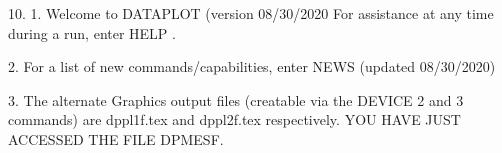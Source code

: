 10.
1. Welcome to DATAPLOT (version 08/30/2020  For assistance at
   any time during a run, enter HELP   .

2. For a list of new commands/capabilities,
   enter NEWS  (updated 08/30/2020)

3. The alternate Graphics output files (creatable
   via the DEVICE 2 and 3 commands) are
   dppl1f.tex and dppl2f.tex respectively.
YOU HAVE JUST ACCESSED THE FILE DPMESF.
